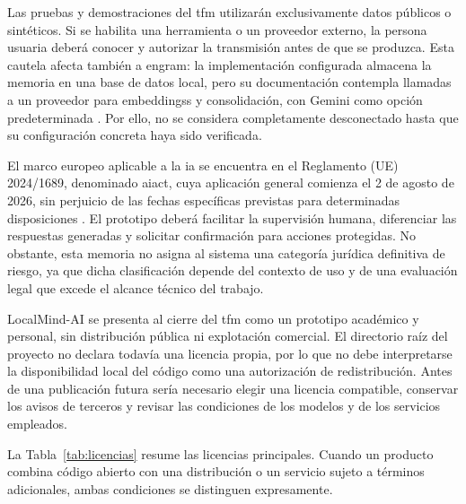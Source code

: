Las pruebas y demostraciones del \gls{tfm} utilizarán exclusivamente datos públicos o sintéticos. Si se habilita una herramienta o un proveedor externo, la persona usuaria deberá conocer y autorizar la transmisión antes de que se produzca. Esta cautela afecta también a \gls{engram}: la implementación configurada almacena la memoria en una base de datos local, pero su documentación contempla llamadas a un proveedor para \glspl{embeddings} y consolidación, con Gemini como opción predeterminada \cite{engramSdk2026}. Por ello, no se considera completamente desconectado hasta que su configuración concreta haya sido verificada.

El marco europeo aplicable a la \gls{ia} se encuentra en el Reglamento (UE) 2024/1689, denominado \gls{aiact}, cuya aplicación general comienza el 2 de agosto de 2026, sin perjuicio de las fechas específicas previstas para determinadas disposiciones \cite{ReglamentoUE20241689}. El prototipo deberá facilitar la supervisión humana, diferenciar las respuestas generadas y solicitar confirmación para acciones protegidas. No obstante, esta memoria no asigna al sistema una categoría jurídica definitiva de riesgo, ya que dicha clasificación depende del contexto de uso y de una evaluación legal que excede el alcance técnico del trabajo.

LocalMind-AI se presenta al cierre del \gls{tfm} como un prototipo académico y personal, sin distribución pública ni explotación comercial. El directorio raíz del proyecto no declara todavía una licencia propia, por lo que no debe interpretarse la disponibilidad local del código como una autorización de redistribución. Antes de una publicación futura sería necesario elegir una licencia compatible, conservar los avisos de terceros y revisar las condiciones de los modelos y de los servicios empleados.

La Tabla~\ref{tab:licencias} resume las licencias principales. Cuando un producto combina código abierto con una distribución o un servicio sujeto a términos adicionales, ambas condiciones se distinguen expresamente.


